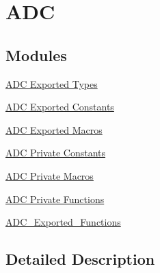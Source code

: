 \hypertarget{group___a_d_c}{}\section{A\+DC}
\label{group___a_d_c}
\subsection*{Modules}
\begin{DoxyCompactItemize}
\item 
\hyperlink{group___a_d_c___exported___types}{A\+D\+C Exported Types}
\item 
\hyperlink{group___a_d_c___exported___constants}{A\+D\+C Exported Constants}
\item 
\hyperlink{group___a_d_c___exported___macros}{A\+D\+C Exported Macros}
\item 
\hyperlink{group___a_d_c___private___constants}{A\+D\+C Private Constants}
\item 
\hyperlink{group___a_d_c___private___macros}{A\+D\+C Private Macros}
\item 
\hyperlink{group___a_d_c___private___functions}{A\+D\+C Private Functions}
\item 
\hyperlink{group___a_d_c___exported___functions}{A\+D\+C\+\_\+\+Exported\+\_\+\+Functions}
\end{DoxyCompactItemize}


\subsection{Detailed Description}
